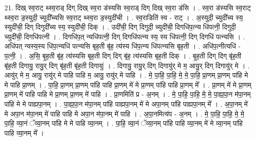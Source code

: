 \documentclass[17pt]{extarticle}
\begin{document}
21. दिख् स्व॒राट् थ्स्व॒राड् दिग् दिख् स्व॒रा ड॑स्यसि स्व॒राड् दिग् दिख् स्व॒रा ड॑सि । . स्व॒रा ड॑स्यसि स्व॒राट् थ्स्व॒रा ड॒स्युदी॒ च्युदी᳚च्यसि स्व॒राट् थ्स्व॒रा ड॒स्युदी॑ची । . स्व॒राडिति॑ स्व - राट् । . अ॒स्युदी॒ च्युदी᳚च्य स्य॒ स्युदी॑ची॒ दिग् दिगुदी᳚च्य स्य॒ स्युदी॑ची॒ दिक् । . उदी॑ची॒ दिग् दिगुदी॒ च्युदी॑ची॒ दिगधि॑प॒त्न्य धि॑पत्नी॒ दिगुदी॒ च्युदी॑ची॒ दिगधि॑पत्नी । . दिगधि॑प॒त् न्यधि॑पत्नी॒ दिग् दिगधि॑पत्न्य स्य॒ स्य धि॑पत्नी॒ दिग् दिगधि॑ पत्न्यसि । . अधि॑पत् न्यस्य॒स्य धि॑प॒त्न्यधि॑ पत्न्यसि बृह॒ती बृ॑ह॒ त्य॑स्य धि॑प॒त्न्य धि॑पत्न्यसि बृह॒ती । . अधि॑प॒त्नीत्यधि॑ - प॒त्नी॒ । . अ॒सि॒ बृ॒ह॒ती बृ॑ह॒ त्य॑स्यसि बृह॒ती दिग् दिग् बृ॑ह॒ त्य॑स्यसि बृह॒ती दिक् । . बृ॒ह॒ती दिग् दिग् बृ॑ह॒ती बृ॑ह॒ती दिगायु॒ रायु॒र् दिग् बृ॑ह॒ती बृ॑ह॒ती दिगायुः॑ । . दिगायु॒ रायु॒र् दिग् दिगायु॑र् मे म॒ आयु॒र् दिग् दिगायु॑र् मे । . आयु॑र् मे म॒ आयु॒ रायु॑र् मे पाहि पाहि म॒ आयु॒ रायु॑र् मे पाहि । . मे॒ पा॒हि॒ पा॒हि॒ मे॒ मे॒ पा॒हि॒ प्रा॒णम् प्रा॒णम् पा॑हि मे मे पाहि प्रा॒णम् । . पा॒हि॒ प्रा॒णम् प्रा॒णम् पा॑हि पाहि प्रा॒णम् मे॑ मे प्रा॒णम् पा॑हि पाहि प्रा॒णम् मे᳚ । . प्रा॒णम् मे॑ मे प्रा॒णम् प्रा॒णम् मे॑ पाहि पाहि मे प्रा॒णम् प्रा॒णम् मे॑ पाहि । . प्रा॒णमिति॑ प्र - अ॒नम् । . मे॒ पा॒हि॒ पा॒हि॒ मे॒ मे॒ पा॒ह्य॒पा॒न म॑पा॒नम् पा॑हि मे मे पाह्यपा॒नम् । . पा॒ह्य॒पा॒न म॑पा॒नम् पा॑हि पाह्यपा॒नम् मे॑ मे अपा॒नम् पा॑हि पाह्यपा॒नम् मे᳚ । . अ॒पा॒नम् मे॑ मे अपा॒न म॑पा॒नम् मे॑ पाहि पाहि मे अपा॒न म॑पा॒नम् मे॑ पाहि । . अ॒पा॒नमित्य॑प - अ॒नम् । . मे॒ पा॒हि॒ पा॒हि॒ मे॒ मे॒ पा॒हि॒ व्या॒नं ॅव्या॒नम् पा॑हि मे मे पाहि व्या॒नम् । . पा॒हि॒ व्या॒नं ॅव्या॒नम् पा॑हि पाहि व्या॒नम् मे॑ मे व्या॒नम् पा॑हि पाहि व्या॒नम् मे᳚ । \newline
\end{document}
